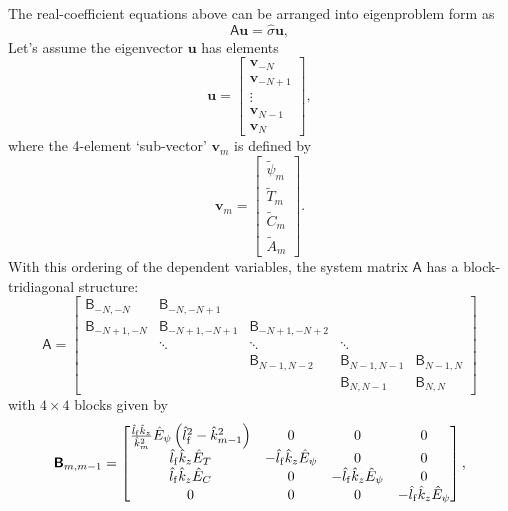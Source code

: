 \documentclass{article}
\newcommand{\shat}{\hat{\sigma}}
\newcommand{\ptil}{\tilde{\psi}}
\newcommand{\Ttil}{\tilde{T}}
\newcommand{\Ctil}{\tilde{C}}
\newcommand{\Atil}{\tilde{A}}
\newcommand{\khat}{\hat{k}}
\newcommand{\lhatf}{\hat{l}_{\rm f}}
\newcommand{\EhatT}{\hat{E}_{T}}
\newcommand{\EhatC}{\hat{E}_{C}}
\newcommand{\Ehatp}{\hat{E}_{\psi}}
\newcommand{\Amat}{\boldsymbol{\mathsf{A}}}
\newcommand{\Bmat}{\boldsymbol{\mathsf{B}}}
\newcommand{\uvec}{\mathbf{u}}
\newcommand{\vvec}{\mathbf{v}}
\begin{document}
The real-coefficient equations above can be arranged into eigenproblem form as
%
\begin{equation}
  \Amat \uvec = \shat \uvec,
\end{equation}
%
Let's assume the eigenvector $\uvec$ has elements
%
\begin{equation}
  \uvec =
  \begin{bmatrix}
    \vvec_{-N} \\
    \vvec_{-N+1} \\
    \vdots \\
    \vvec_{N-1} \\
    \vvec_{N}
  \end{bmatrix},
\end{equation}
%
where the 4-element `sub-vector' $\vvec_{m}$ is defined by
%
\begin{equation}
  \vvec_{m} =
  \begin{bmatrix}
    \ptil_{m} \\
    \Ttil_{m} \\
    \Ctil_{m} \\
    \Atil_{m}
  \end{bmatrix}.
\end{equation}
%
With this ordering of the dependent variables, the system matrix
$\Amat$ has a block-tridiagonal structure:
%
\begin{equation}
  \Amat =
  \begin{bmatrix}
    \Bmat_{-N,-N} & \Bmat_{-N,-N+1} & & & \\
    \Bmat_{-N+1,-N} & \Bmat_{-N+1,-N+1} & \Bmat_{-N+1,-N+2} & & \\
    & \ddots & \ddots & \ddots & \\
    & & \Bmat_{N-1,N-2} & \Bmat_{N-1,N-1} & \Bmat_{N-1,N} \\
    & & & \Bmat_{N,N-1} & \Bmat_{N,N}
  \end{bmatrix}
\end{equation}
%
with $4\times4$ blocks given by
%
\begin{equation}
  \Bmat_{m,m-1} =
  \begin{bmatrix}
    \frac{\lhatf \khat_z}{\khat^2_m} \Ehatp \left( \lhatf^2 - \khat^2_{m-1} \right) &
    0 &
    0 &
    0 \\
    \lhatf \khat_z \EhatT &
    -\lhatf \khat_z \Ehatp &
    0 &
    0 \\
    \lhatf \khat_z \EhatC &
    0 & 
    -\lhatf \khat_z \Ehatp &
    0 \\
    0 &
    0 &
    0 &
    -\lhatf \khat_z \Ehatp
  \end{bmatrix},
\end{equation}
\end{document}
